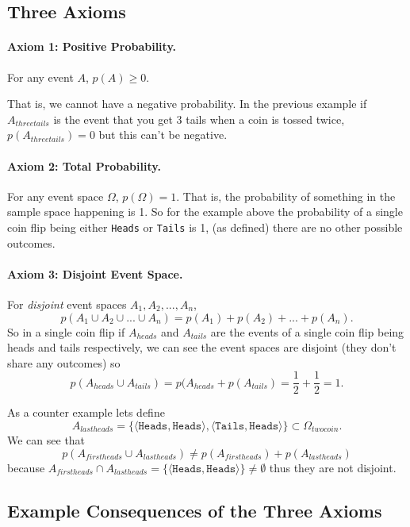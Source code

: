 \subsection{Three Axioms}

\paragraph{Axiom 1: Positive Probability.}
For any event $A$, $p(A)\ge 0$.

That is, we cannot have a negative probability. 
In the previous example if $A_{threetails}$ is the event that you get 3 tails when a coin is tossed twice, 
$p(A_{threetails})=0$ but this can't be negative.

\paragraph{Axiom 2: Total Probability.}
For any event space $\Omega$, $p(\Omega)=1$. 
That is, the probability of something in the sample space happening is 1. 
So for the example above the probability of a single coin flip being either \texttt{Heads} or \texttt{Tails} is 1, 
(as defined) there are no other possible outcomes. 

\paragraph{Axiom 3: Disjoint Event Space.}
For \textit{disjoint} event spaces $A_1, A_2, ..., A_n$, \[p(A_1\cup A_2\cup ... \cup A_n)=p(A_1) + p(A_2) + ... + p(A_n).\]
So in a single coin flip if $A_{heads}$ and $A_{tails}$ are the events of a single coin flip being heads and tails respectively, 
we can see the event spaces are disjoint (they don't share any outcomes)
so \[p(A_{heads} \cup A_{tails}) = p(A_{heads} + p(A_{tails}) = \frac{1}{2} + \frac{1}{2} = 1.\]

As a counter example lets define \[A_{lastheads}=\{
\langle\texttt{Heads},\texttt{Heads}\rangle,
\langle\texttt{Tails},\texttt{Heads}\rangle\} \subset \Omega_{twocoin}. \]
We can see that 
\[p(A_{firstheads} \cup A_{lastheads}) \ne p(A_{firstheads}) + p(A_{lastheads})\]
because $A_{firstheads} \cap A_{lastheads} = \{\langle\texttt{Heads},\texttt{Heads}\rangle\} \ne \emptyset$ thus they are not disjoint.


\subsection{Example Consequences of the Three Axioms}

